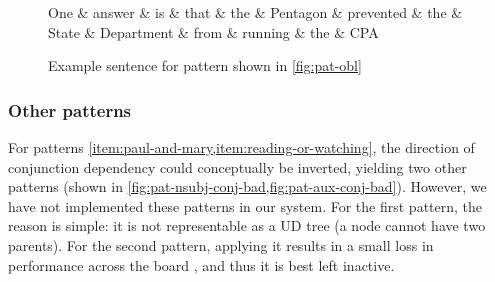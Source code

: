 \documentclass[11pt,a4paper]{article}
\begin{document}
\begin{figure*}[ht]
    \centering
    \begin{dependency}
    \begin{deptext}[column sep=0.1cm]
    One \& answer \& is \& that \& the \& Pentagon \& prevented \& the \& State \& Department \& from \& running \& the \& CPA  \\
    \end{deptext}
    \end{dependency}
    \caption{Example sentence for pattern shown in \cref{fig:pat-obl}}
    \label{fig:rel-clause}
\end{figure*}



\subsubsection{Other patterns}
For patterns \cref{item:paul-and-mary,item:reading-or-watching}, the
direction of conjunction dependency could conceptually be inverted, yielding two
other patterns (shown in
\cref{fig:pat-nsubj-conj-bad,fig:pat-aux-conj-bad}). However, we have
not implemented these patterns in our system. For the first pattern,
the reason is simple: it is not representable as a UD tree (a node
cannot have two parents). For the second pattern, applying it
results in a small loss in performance across the board , and thus it is best left inactive.
\end{document}
